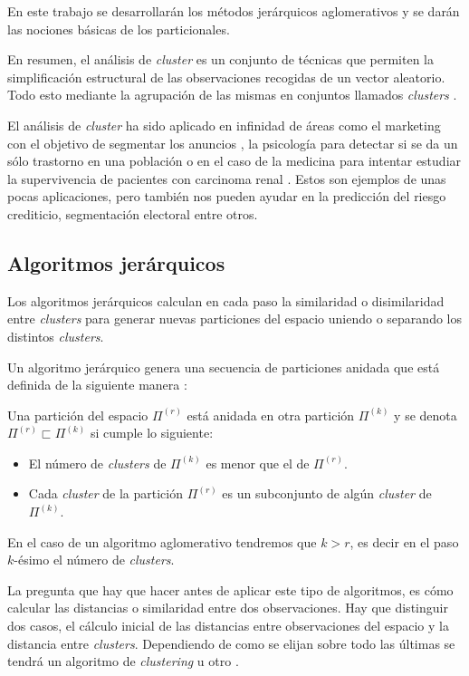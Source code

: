 \noindent En este trabajo se desarrollarán los métodos jerárquicos aglomerativos y se darán las nociones básicas de los particionales.

\noindent En resumen, el análisis de \emph{cluster} es un conjunto de técnicas que permiten la simplificación estructural de las observaciones recogidas de un vector aleatorio. Todo esto mediante la agrupación de las mismas en conjuntos llamados \emph{clusters} \cite{Everitt 2011}. 

\noindent El análisis de \emph{cluster} ha sido aplicado en infinidad de áreas como el marketing con el objetivo de segmentar los anuncios \cite{Okazaki 2006}, la psicología para detectar si se da un sólo trastorno en una población \cite{Everitt 2002} o en el caso de la medicina para intentar estudiar la supervivencia de pacientes con carcinoma renal \cite{Witten 2010}. Estos son ejemplos de unas pocas aplicaciones, pero también nos pueden ayudar en la predicción del riesgo crediticio, segmentación electoral entre otros. 

\subsection{Algoritmos jerárquicos}

\noindent Los algoritmos jerárquicos calculan en cada paso la similaridad o disimilaridad entre \emph{clusters} para generar nuevas particiones del espacio uniendo o separando los distintos \emph{clusters}.

\noindent Un algoritmo jerárquico genera una secuencia de particiones anidada que está definida de la siguiente manera \cite{Scitovski 2021} :
\begin{defi}
Una partición del espacio $\Pi^{(r)}$ está anidada en otra partición $\Pi^{(k)}$ y se denota $\Pi^{(r)} \sqsubset \Pi^{(k)}$ si cumple lo siguiente:
\begin{itemize}
\item El número de \emph{clusters} de $\Pi^{(k)}$ es menor que el de $\Pi^{(r)}$. 
\item Cada \emph{cluster} de la partición $\Pi^{(r)}$ es un subconjunto de algún \emph{cluster} de $\Pi^{(k)}$. 
\end{itemize}
En el caso de un algoritmo aglomerativo tendremos que $k>r$, es decir en el paso $k$-ésimo el número de \emph{clusters}.

\end{defi}

\noindent La pregunta que hay que hacer antes de aplicar este tipo de algoritmos, es cómo calcular las distancias o similaridad entre dos observaciones. Hay que distinguir dos casos, el cálculo inicial de las distancias entre observaciones del espacio y la distancia entre \emph{clusters}. Dependiendo de como se elijan sobre todo las últimas se tendrá un algoritmo de \emph{clustering} u otro \cite{Peña 2002}. 

